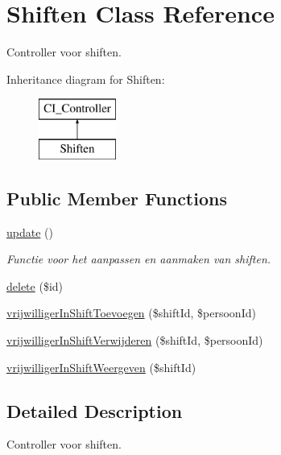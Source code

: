 \hypertarget{class_shiften}{}\section{Shiften Class Reference}
\label{class_shiften}


Controller voor shiften.  


Inheritance diagram for Shiften\+:\begin{figure}[H]
\begin{center}
\leavevmode
\includegraphics[height=2.000000cm]{class_shiften}
\end{center}
\end{figure}
\subsection*{Public Member Functions}
\begin{DoxyCompactItemize}
\item 
\mbox{\label{class_shiften_af783a05fca5d9fe438122482ce10ded8}} 
\mbox{\hyperlink{class_shiften_af783a05fca5d9fe438122482ce10ded8}{update}} ()
\begin{DoxyCompactList}\small\item\em Functie voor het aanpassen en aanmaken van shiften. \end{DoxyCompactList}\item 
\mbox{\hyperlink{class_shiften_a68ff1255b0af39c545eae586c3fac0b8}{delete}} (\$id)
\item 
\mbox{\hyperlink{class_shiften_a68ed5c1cd7c018cd80ceb6bc940afa7f}{vrijwilliger\+In\+Shift\+Toevoegen}} (\$shift\+Id, \$persoon\+Id)
\item 
\mbox{\hyperlink{class_shiften_a67201ed9a01bf5fe153c6c8d2a60e9ad}{vrijwilliger\+In\+Shift\+Verwijderen}} (\$shift\+Id, \$persoon\+Id)
\item 
\mbox{\hyperlink{class_shiften_a9919cdc243d1281466d02e8b5d102e69}{vrijwilliger\+In\+Shift\+Weergeven}} (\$shift\+Id)
\end{DoxyCompactItemize}


\subsection{Detailed Description}
Controller voor shiften. 

